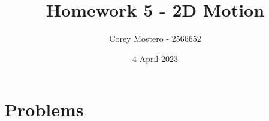 \documentclass{article}
\title{Homework 5 - 2D Motion}
\author{Corey Mostero - 2566652}
\date{4 April 2023}
\begin{document}
\newcommand{\hr}{\par\noindent\rule{\textwidth}{0.4pt}}

\newcommand{\bc}[1]{
	\begin{equation*}
		\begin{boxed}
			{#1}
		\end{boxed}
	\end{equation*}
}

\newcommand{\cond}[2]{
	\ifmmode
		{#1} \quad {#2}
	\else
		$$ {#1} \quad {#2} $$
	\fi
}

\maketitle
\newpage

\tableofcontents

\section{Problems}
\end{document}
